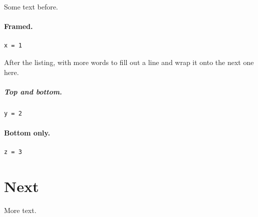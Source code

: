 \documentclass{article}
\begin{document}
Some text before.

\paragraph{Framed.}
\begin{lstlisting}[frame=single,caption={With a caption},label=lst:f]
x = 1
\end{lstlisting}
After the listing, with more words to fill out a line and wrap it onto the next one here.

\subparagraph{Top and bottom.}
\begin{lstlisting}[frame=tb,basicstyle=\small\ttfamily]
y = 2
\end{lstlisting}

\paragraph{Bottom only.}
\begin{lstlisting}[frame=b]
z = 3
\end{lstlisting}
\section{Next}
More text.
\end{document}
